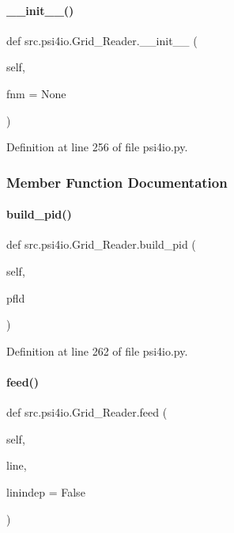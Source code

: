 \paragraph{\texorpdfstring{\+\_\+\+\_\+init\+\_\+\+\_\+()}{\_\_init\_\_()}}
{\footnotesize\ttfamily def src.\+psi4io.\+Grid\+\_\+\+Reader.\+\_\+\+\_\+init\+\_\+\+\_\+ (\begin{DoxyParamCaption}\item[{}]{self,  }\item[{}]{fnm = {\ttfamily None} }\end{DoxyParamCaption})}



Definition at line 256 of file psi4io.\+py.



\subsubsection{Member Function Documentation}
\mbox{\label{classsrc_1_1psi4io_1_1Grid__Reader_ac34edbf7351494da884a7add4d30c3bf}} 
\paragraph{\texorpdfstring{build\+\_\+pid()}{build\_pid()}}
{\footnotesize\ttfamily def src.\+psi4io.\+Grid\+\_\+\+Reader.\+build\+\_\+pid (\begin{DoxyParamCaption}\item[{}]{self,  }\item[{}]{pfld }\end{DoxyParamCaption})}



Definition at line 262 of file psi4io.\+py.

\mbox{\label{classsrc_1_1psi4io_1_1Grid__Reader_aebcee69c16c83386050a36174be65e5c}} 
\paragraph{\texorpdfstring{feed()}{feed()}}
{\footnotesize\ttfamily def src.\+psi4io.\+Grid\+\_\+\+Reader.\+feed (\begin{DoxyParamCaption}\item[{}]{self,  }\item[{}]{line,  }\item[{}]{linindep = {\ttfamily False} }\end{DoxyParamCaption})}



